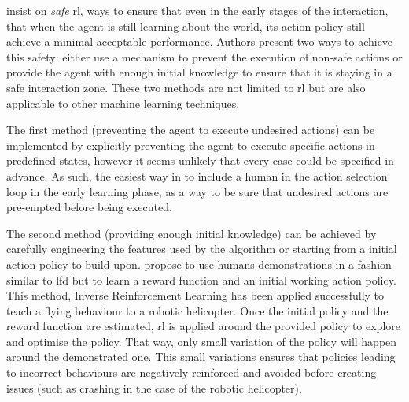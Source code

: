 	\cite{garcia2015comprehensive} insist on \textit{safe} \gls{rl}, ways to ensure that even in the early stages of the interaction, that when the agent is still learning about the world, its action policy still achieve a minimal acceptable performance. Authors present two ways to achieve this safety: either use a mechanism to prevent the execution of non-safe actions or provide the agent with enough initial knowledge to ensure that it is staying in a safe interaction zone. These two methods are not limited to \gls{rl} but are also applicable to other machine learning techniques. 
	
	The first method (preventing the agent to execute undesired actions) can be implemented by explicitly preventing the agent to execute specific actions in predefined states, however it seems unlikely that every case could be specified in advance. As such, the easiest way in to include a human in the action selection loop in the early learning phase, as a way to be sure that undesired actions are pre-empted before being executed. 
	
	The second method (providing enough initial knowledge) can be achieved by carefully engineering the features used by the algorithm or starting from a initial action policy to build upon. \cite{abbeel2004apprenticeship} propose to use humans demonstrations in a fashion similar to \gls{lfd} but to learn a reward function and an initial working action policy. This method, Inverse Reinforcement Learning has been applied successfully to teach a flying behaviour to a robotic helicopter. Once the initial policy and the reward function are estimated, \gls{rl} is applied around the provided policy to explore and optimise the policy. That way, only small variation of the policy will happen around the demonstrated one. This small variations ensures that policies leading to incorrect behaviours are negatively reinforced and avoided before creating issues (such as crashing in the case of the robotic helicopter). 
	
	
